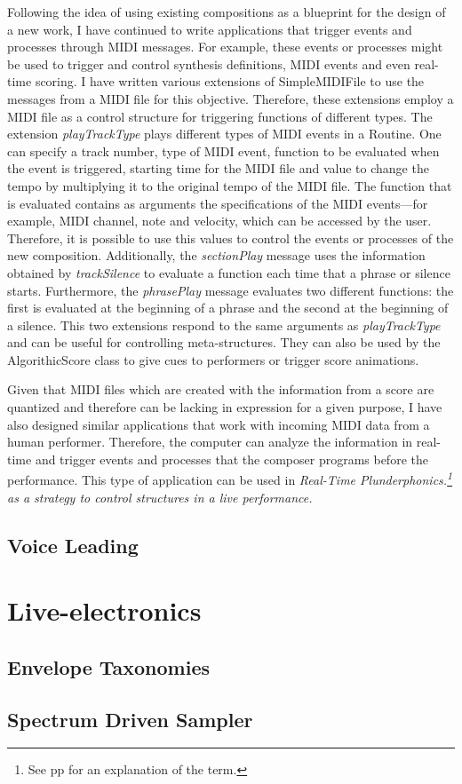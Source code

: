 Following the idea of using existing compositions as a blueprint for the design of a new work, I have continued to write applications that trigger events and processes through MIDI messages. For example, these events or processes might be used to trigger and control synthesis definitions, MIDI events and even real-time scoring. I have written various extensions of SimpleMIDIFile to use the messages from a MIDI file for this objective. Therefore, these extensions employ a MIDI file as a control structure for triggering functions of different types.
The extension \emph{playTrackType} plays different types of MIDI events in a Routine. One can specify a track number, type of MIDI event, function to be evaluated when the event is triggered, starting time for the MIDI file and  value to change the tempo by multiplying it to the original tempo of the MIDI file. The function that is evaluated contains as arguments the specifications of the MIDI events---for example, MIDI channel, note and velocity, which can be accessed by the user. Therefore, it is possible to use this values to control the events or processes of the new composition. Additionally, the \emph{sectionPlay} message uses the information obtained by \emph{trackSilence} to evaluate a function each time that a phrase or silence starts. Furthermore, the \emph{phrasePlay} message evaluates two different functions: the first is evaluated at the beginning of a phrase and the second at the beginning of a silence. This two extensions respond to the same arguments as \emph{playTrackType} and can be useful for controlling meta-structures. They can also be used by the AlgorithicScore class to give cues to performers or trigger score animations. 

Given that MIDI files which are created with the information from a score are quantized and therefore can be lacking in expression for a given purpose, I have also designed similar applications that work with incoming MIDI data from a human performer. Therefore, the computer can analyze the information in real-time and trigger events and processes that the composer programs before the performance. This type of application can be used in \emph{Real-Time Plunderphonics.\footnote{See pp  for an explanation of  the term.} as a strategy to control structures in a live performance.}

\subsection{Voice Leading}

\section{Live-electronics}

\subsection{Envelope Taxonomies}

\subsection{Spectrum Driven Sampler}


\label{ch:compamp}